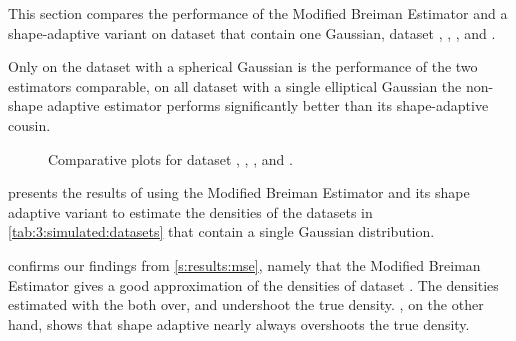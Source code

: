 
This section compares the performance of the Modified Breiman Estimator and a shape-adaptive variant on dataset that contain one Gaussian, \ie dataset \ferdosiOne, \baakmanOne, \baakmanFour, and \baakmanFive.

Only on the dataset with a spherical Gaussian is the performance of the two estimators comparable, on all dataset with a single elliptical Gaussian the non-shape adaptive estimator performs significantly better than its shape-adaptive cousin.

	\begin{figure*}[!ht]
		\centering
		
		\caption{Comparative plots for dataset \ferdosiOneNum, \baakmanOneNum, \baakmanFourNum, and \baakmanFiveNum.
		}
		\label{fig:4:results:singleSphere}
	\end{figure*}

	 presents the results of using the Modified Breiman Estimator and its shape adaptive variant to estimate the densities of the datasets in \cref{tab:3:simulated:datasets} that contain a single Gaussian distribution. 

		 confirms our findings from \cref{s:results:mse}, namely that the Modified Breiman Estimator gives a good approximation of the densities of dataset \ferdosiOne. The densities estimated with the \mbe both over, and undershoot the true density. , on the other hand, shows that shape adaptive \mbe nearly always overshoots the true density. 

